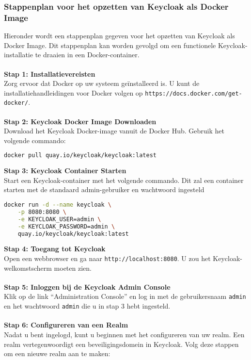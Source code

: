 \subsubsection{Stappenplan voor het opzetten van Keycloak als Docker Image}%
\label{subsubsec:keycloak-setup}
Hieronder wordt een stappenplan gegeven voor het opzetten van Keycloak als Docker Image. Dit stappenplan kan worden gevolgd om een functionele Keycloak-installatie te draaien in een Docker-container.\\\\
\textbf{Stap 1: Installatievereisten}\\
Zorg ervoor dat Docker op uw systeem geïnstalleerd is. U kunt de installatiehandleidingen voor Docker volgen op \texttt{https://docs.docker.com/get-docker/}.\\\\
\textbf{Stap 2: Keycloak Docker Image Downloaden}\\
Download het Keycloak Docker-image vanuit de Docker Hub. Gebruik het volgende commando:
\begin{lstlisting}[language=bash, caption=Keycloak Docker Image downloaden]
docker pull quay.io/keycloak/keycloak:latest
\end{lstlisting}
\textbf{Stap 3: Keycloak Container Starten}\\
Start een Keycloak-container met het volgende commando. Dit zal een container starten met de standaard admin-gebruiker en wachtwoord ingesteld
\begin{lstlisting}[language=bash, caption=Keycloak Docker Image starten]
docker run -d --name keycloak \
    -p 8080:8080 \
    -e KEYCLOAK_USER=admin \
    -e KEYCLOAK_PASSWORD=admin \
    quay.io/keycloak/keycloak:latest
\end{lstlisting}
\textbf{Stap 4: Toegang tot Keycloak}\\
Open een webbrowser en ga naar \texttt{http://localhost:8080}. U zou het Keycloak-welkomstscherm moeten zien.\\\\
\textbf{Stap 5: Inloggen bij de Keycloak Admin Console}\\
Klik op de link ``Administration Console'' en log in met de gebruikersnaam \texttt{admin} en het wachtwoord \texttt{admin} die u in stap 3 hebt ingesteld.\\\\
\textbf{Stap 6: Configureren van een Realm}\\
Nadat u bent ingelogd, kunt u beginnen met het configureren van uw realm. Een realm vertegenwoordigt een beveiligingsdomein in Keycloak. Volg deze stappen om een nieuwe realm aan te maken:
